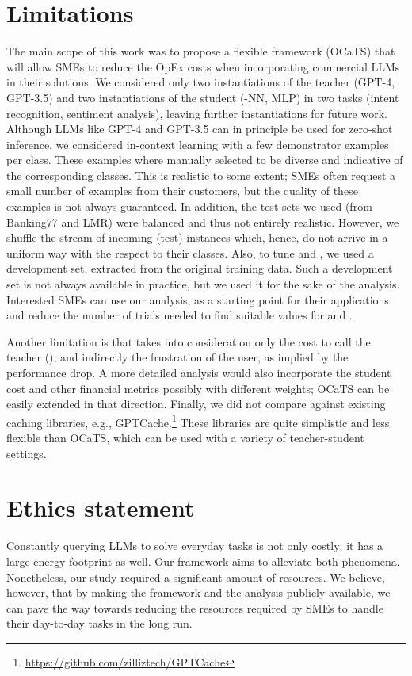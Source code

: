 \documentclass[11pt]{article}
\begin{document}
\section{Limitations}
The main scope of this work was to propose a flexible framework (OCaTS) that will allow SMEs to reduce the OpEx costs when incorporating commercial LLMs in their solutions. We considered only two instantiations of the teacher (GPT-4, GPT-3.5) and two instantiations of the student (-NN, MLP) in two tasks (intent recognition, sentiment analysis), leaving further instantiations for future work. 
Although LLMs like GPT-4 and GPT-3.5 can in principle be used for zero-shot inference, we considered in-context learning with
a few demonstrator examples per class. These examples where manually selected to be diverse and indicative of the corresponding classes. This is realistic to some extent; SMEs often request a small number of examples from their customers, but the quality of these examples is not always guaranteed.  In addition, the test sets we used (from Banking77 and LMR) 
were balanced and thus not entirely realistic. However, we shuffle the stream of incoming (test) instances which, hence, do not arrive in a uniform way with the respect to their classes. Also, to tune  and , we used a development set, extracted from the original training data. Such a development set is not always available in practice, but we used it for the sake of the analysis. Interested SMEs can use our analysis, as a starting point for their applications and reduce the number of trials needed to find suitable values for  and . 

Another limitation is that  takes into consideration only the cost to call the teacher (), and indirectly the frustration of the user, as implied by the performance drop. A more detailed analysis would also incorporate the student cost and other financial metrics possibly with different weights; OCaTS can be easily extended in that direction. Finally, we did not compare against existing caching libraries, e.g., GPTCache.\footnote{\url{https://github.com/zilliztech/GPTCache}} These libraries are quite simplistic and less flexible than OCaTS, which can be used with a variety of teacher-student settings.

\section{Ethics statement}
Constantly querying LLMs to solve everyday tasks is not only costly; it has a large energy footprint as well. Our framework aims to alleviate both phenomena. Nonetheless, our study required a significant amount of resources. We believe, however, that by making the framework and the analysis publicly available, we can pave the way towards reducing the resources required by SMEs to handle their day-to-day tasks in the long run.
\end{document}
